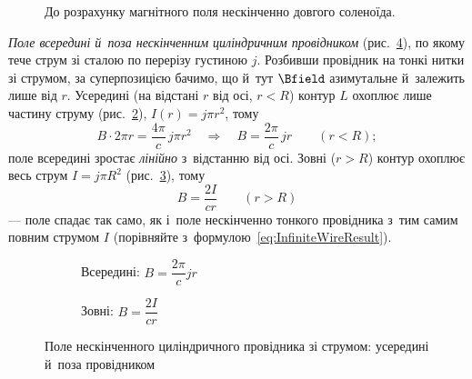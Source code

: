 \begin{figure}[h!]\centering
	\caption{До розрахунку магнітного поля нескінченно довгого соленоїда.}
	\label{pic:solenoidField}
\end{figure}

\emph{Поле всередині й~поза нескінченним циліндричним провідником}
(рис.~\ref{pic:CylinderField}), по якому тече струм зі сталою по перерізу густиною $j$. Розбивши провідник на тонкі нитки зі
струмом, за суперпозицією бачимо, що й~тут $\Bfield$ азимутальне й~залежить лише від $r$.
Усередині (на відстані $r$ від осі, $r<R$) контур $L$ охоплює лише частину струму (рис.~\ref{pic:cyl_inside}), $I(r) =
	j\pi r^2$, тому
\begin{equation*}
	B\cdot 2\pi r = \frac{4\pi}{c}\, j\pi r^2 \quad\Rightarrow\quad B = \frac{2\pi}{c}\,jr \qquad (r < R);
\end{equation*}
поле всередині зростає \emph{лінійно} з~відстанню від осі. Зовні ($r>R$) контур охоплює
весь струм $I = j\pi R^2$ (рис.~\ref{pic:cyl_outside}), тому
\begin{equation*}
	B = \frac{2I}{cr} \qquad (r > R)
\end{equation*}
--- поле спадає так само, як і~поле нескінченно тонкого провідника з~тим самим повним
струмом $I$ (порівняйте з~формулою~\eqref{eq:InfiniteWireResult}).

\begin{figure}[h!]\centering
	\begin{subfigure}[t]{0.48\linewidth}
		\centering
		\caption{Всередині: \( B = \dfrac{2\pi}{c}jr \)}
		\label{pic:cyl_inside}
	\end{subfigure}\hfill
	\begin{subfigure}[t]{0.48\linewidth}
		\centering
		\caption{Зовні: \( B = \dfrac{2I}{cr} \)}
		\label{pic:cyl_outside}
	\end{subfigure}
	\caption{Поле нескінченного циліндричного провідника зі струмом: усередині й~поза
		провідником\label{pic:CylinderField}}
\end{figure}


